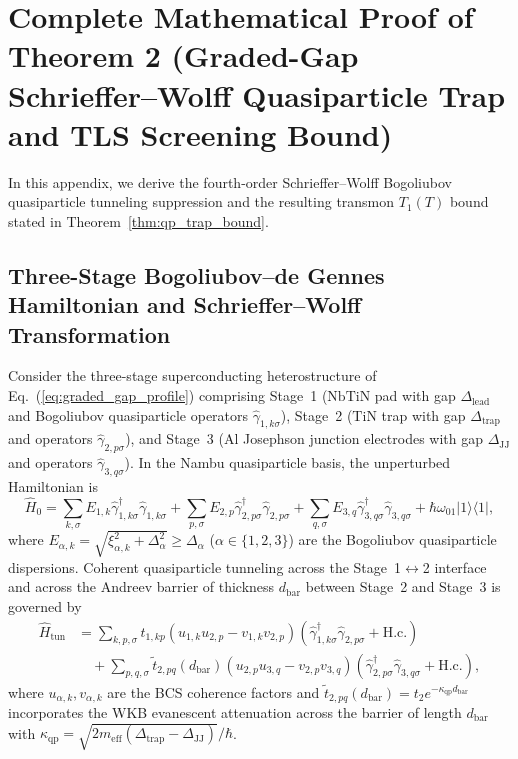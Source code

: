 \documentclass[11pt,letterpaper]{article}
\theoremstyle{definition}
\begin{document}
\section{Complete Mathematical Proof of Theorem 2 (Graded-Gap Schrieffer--Wolff Quasiparticle Trap and TLS Screening Bound)}
\label{app:proof_thm2}

In this appendix, we derive the fourth-order Schrieffer--Wolff Bogoliubov quasiparticle tunneling suppression and the resulting transmon $T_1(T)$ bound stated in Theorem~\ref{thm:qp_trap_bound}.

\subsection{Three-Stage Bogoliubov--de Gennes Hamiltonian and Schrieffer--Wolff Transformation}

Consider the three-stage superconducting heterostructure of Eq.~(\ref{eq:graded_gap_profile}) comprising Stage~1 ($\mathrm{NbTiN}$ pad with gap $\Delta_{\mathrm{lead}}$ and Bogoliubov quasiparticle operators $\hat{\gamma}_{1,k\sigma}$), Stage~2 ($\mathrm{TiN}$ trap with gap $\Delta_{\mathrm{trap}}$ and operators $\hat{\gamma}_{2,p\sigma}$), and Stage~3 ($\mathrm{Al}$ Josephson junction electrodes with gap $\Delta_{\mathrm{JJ}}$ and operators $\hat{\gamma}_{3,q\sigma}$). In the Nambu quasiparticle basis, the unperturbed Hamiltonian is
\begin{equation}
  \hat{H}_0 = \sum_{k,\sigma} E_{1,k} \hat{\gamma}_{1,k\sigma}^\dagger \hat{\gamma}_{1,k\sigma} + \sum_{p,\sigma} E_{2,p} \hat{\gamma}_{2,p\sigma}^\dagger \hat{\gamma}_{2,p\sigma} + \sum_{q,\sigma} E_{3,q} \hat{\gamma}_{3,q\sigma}^\dagger \hat{\gamma}_{3,q\sigma} + \hbar\omega_{01} |1\rangle\langle 1|,
  \label{eq:appC_H0}
\end{equation}
where $E_{\alpha,k} = \sqrt{\xi_{\alpha,k}^2 + \Delta_\alpha^2} \ge \Delta_\alpha$ ($\alpha \in \{1,2,3\}$) are the Bogoliubov quasiparticle dispersions. Coherent quasiparticle tunneling across the Stage~1$\leftrightarrow$2 interface and across the Andreev barrier of thickness $d_{\mathrm{bar}}$ between Stage~2 and Stage~3 is governed by
\begin{equation}
\begin{aligned}
  \hat{H}_{\mathrm{tun}} &= \sum_{k,p,\sigma} t_{1,kp} (u_{1,k} u_{2,p} - v_{1,k} v_{2,p}) \left(\hat{\gamma}_{1,k\sigma}^\dagger \hat{\gamma}_{2,p\sigma} + \mathrm{H.c.}\right) \\
  &\quad + \sum_{p,q,\sigma} \tilde{t}_{2,pq}(d_{\mathrm{bar}}) (u_{2,p} u_{3,q} - v_{2,p} v_{3,q}) \left(\hat{\gamma}_{2,p\sigma}^\dagger \hat{\gamma}_{3,q\sigma} + \mathrm{H.c.}\right),
\end{aligned}
  \label{eq:appC_Htun}
\end{equation}
where $u_{\alpha,k}, v_{\alpha,k}$ are the BCS coherence factors and $\tilde{t}_{2,pq}(d_{\mathrm{bar}}) = t_2 e^{-\kappa_{\mathrm{qp}} d_{\mathrm{bar}}}$ incorporates the WKB evanescent attenuation across the barrier of length $d_{\mathrm{bar}}$ with $\kappa_{\mathrm{qp}} = \sqrt{2m_{\mathrm{eff}}(\Delta_{\mathrm{trap}} - \Delta_{\mathrm{JJ}})}/\hbar$.
\end{document}
